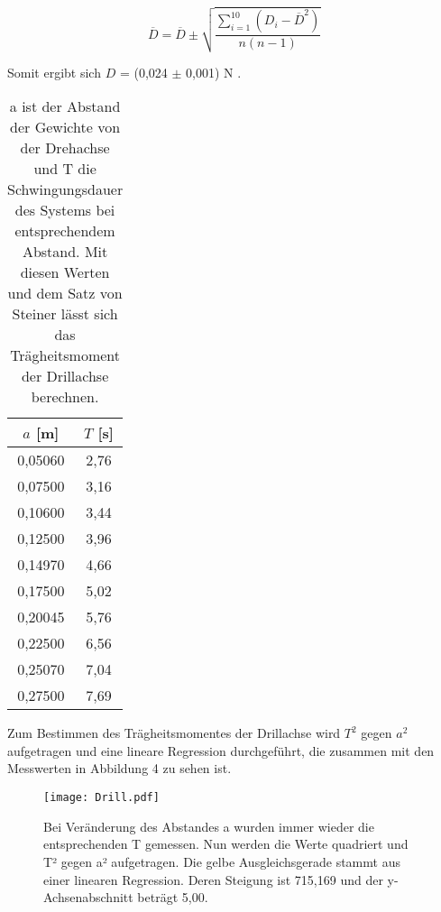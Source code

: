 \documentclass[titlepage = firstcover]{scrartcl}
\begin{document}
      \begin{equation}
        \overline{D} = \overline{D} \pm \sqrt{\frac{\sum_{i=1}^{10}(D_i - \overline{D}^2)}{n(n-1)}}
      \end{equation}

      Somit ergibt sich $D$ = (0,024 $\pm$ 0,001) N .
      \begin{table}[h]
        \centering
        \caption{a ist der Abstand der Gewichte von der Drehachse und T die Schwingungsdauer des Systems bei entsprechendem Abstand. Mit diesen Werten und dem Satz von Steiner lässt sich das Trägheitsmoment der Drillachse berechnen.}
        \label{tab:Tabelle_2}
        
        \begin{tabular}{c c}
          \toprule
          {$a$ [m]} & {$T$ [s]} \\
          \midrule
          0,05060 & 2,76 \\
          0,07500 & 3,16 \\
          0,10600 & 3,44 \\
          0,12500 & 3,96 \\
          0,14970 & 4,66 \\
          0,17500 & 5,02 \\
          0,20045 & 5,76 \\
          0,22500 & 6,56 \\
          0,25070 & 7,04 \\
          0,27500 & 7,69 \\
          \bottomrule
        \end{tabular}
      \end{table}
      
      Zum Bestimmen des Trägheitsmomentes der Drillachse wird $T^2$ gegen $a^2$ aufgetragen und eine lineare Regression durchgeführt, die zusammen mit den Messwerten
      in Abbildung 4 zu sehen ist. \newline

      \begin{figure}[h]
        \centering
        \texttt{[image: Drill.pdf]}
        \caption{Bei Veränderung des Abstandes a wurden immer wieder die entsprechenden T gemessen. Nun werden die Werte quadriert und T² gegen a² aufgetragen. Die gelbe Ausgleichsgerade stammt aus einer linearen Regression. Deren Steigung ist 715,169 und der y-Achsenabschnitt beträgt 5,00.}
      \end{figure}
      
\end{document}
